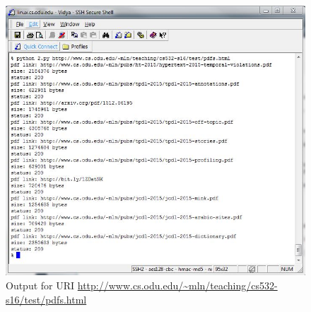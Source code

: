 \begin{figure}[h!]
\begin{center}
\includegraphics[scale=0.55, keepaspectratio=true]{figures/URI3.JPG}
\caption{Output for URI \url {http://www.cs.odu.edu/~mln/teaching/cs532-s16/test/pdfs.html}}
\label{mcpon_navy_mil}
\end{center}
\end{figure}